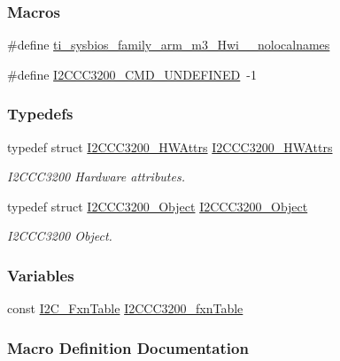 \subsubsection*{Macros}
\begin{DoxyCompactItemize}
\item 
\#define \hyperlink{_i2_c_c_c3200_8h_aaa17ecf48f5762e2e1bdb0bab8aacf0c}{ti\-\_\-sysbios\-\_\-family\-\_\-arm\-\_\-m3\-\_\-\-Hwi\-\_\-\-\_\-nolocalnames}
\item 
\#define \hyperlink{_i2_c_c_c3200_8h_a64054521d7711a0efafa007d7bc9e218}{I2\-C\-C\-C3200\-\_\-\-C\-M\-D\-\_\-\-U\-N\-D\-E\-F\-I\-N\-E\-D}~-\/1
\end{DoxyCompactItemize}
\subsubsection*{Typedefs}
\begin{DoxyCompactItemize}
\item 
typedef struct \hyperlink{struct_i2_c_c_c3200___h_w_attrs}{I2\-C\-C\-C3200\-\_\-\-H\-W\-Attrs} \hyperlink{_i2_c_c_c3200_8h_a684a95a71c6d653f099add355c43a1dd}{I2\-C\-C\-C3200\-\_\-\-H\-W\-Attrs}
\begin{DoxyCompactList}\small\item\em I2\-C\-C\-C3200 Hardware attributes. \end{DoxyCompactList}\item 
typedef struct \hyperlink{struct_i2_c_c_c3200___object}{I2\-C\-C\-C3200\-\_\-\-Object} \hyperlink{_i2_c_c_c3200_8h_aa8410656ed73821e36a81fd1e4c083a8}{I2\-C\-C\-C3200\-\_\-\-Object}
\begin{DoxyCompactList}\small\item\em I2\-C\-C\-C3200 Object. \end{DoxyCompactList}\end{DoxyCompactItemize}
\subsubsection*{Variables}
\begin{DoxyCompactItemize}
\item 
const \hyperlink{struct_i2_c___fxn_table}{I2\-C\-\_\-\-Fxn\-Table} \hyperlink{_i2_c_c_c3200_8h_a8d55c316465052f05df19d16002be53a}{I2\-C\-C\-C3200\-\_\-fxn\-Table}
\end{DoxyCompactItemize}


\subsubsection{Macro Definition Documentation}
